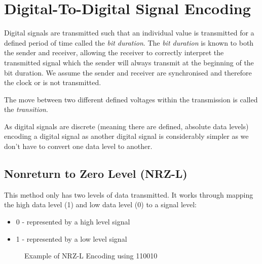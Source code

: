\section{Digital-To-Digital Signal Encoding}
Digital signals are transmitted such that an individual value is transmitted for a defined period of time called the \textit{bit duration}. The \textit{bit duration} is known to both the sender and receiver, allowing the receiver to correctly interpret the transmitted signal which the sender will always transmit at the beginning of the bit duration. We assume the sender and receiver are synchronised and therefore the clock or is not transmitted.

The move between two different defined voltages within the transmission is called the \textit{transition}.

As digital signals are discrete (meaning there are defined, absolute data levels) encoding a digital signal as another digital signal is considerably simpler as we don't have to convert one data level to another. 

\subsection{Nonreturn to Zero Level (NRZ-L)}
This method only has two levels of data transmitted. It works through mapping the high data level (1) and low data level (0) to a signal level:
\begin{itemize}
    \item 0 - represented by a high level signal
    \item 1 - represented by a low level signal
\end{itemize}

\begin{figure}[H]
\centering
{}
\caption{Example of NRZ-L Encoding using 110010}
\end{figure}

